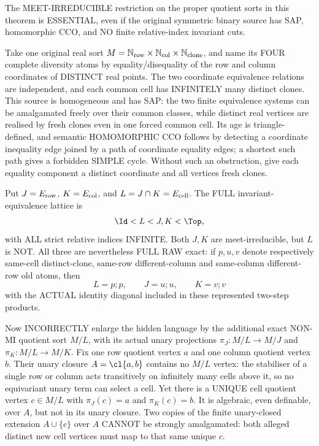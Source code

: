 \begin{example}
\label{ex:typed-exact-nonmi-hidden-sap-failure}
The MEET-IRREDUCIBLE restriction on the
proper quotient sorts in this theorem is
ESSENTIAL, even if the original symmetric
binary source has SAP, homomorphic CCO,
and NO finite relative-index invariant cuts.

Take one original real sort
$M=\mathbb N_{\rm row}\times
\mathbb N_{\rm col}\times\mathbb N_{\rm clone}$,
and name its FOUR complete diversity atoms
by equality/disequality of the row and
column coordinates of DISTINCT real points.
The two coordinate equivalence relations
are independent, and each common cell
has INFINITELY many distinct clones.
This source is homogeneous and has SAP:
the two finite equivalence systems can
be amalgamated freely over their common
classes, while distinct real vertices
are realised by fresh clones even in
one forced common cell.  Its age is
triangle-defined, and semantic HOMOMORPHIC
CCO follows by detecting a coordinate
inequality edge joined by a path of
coordinate equality edges; a shortest
such path gives a forbidden SIMPLE cycle.
Without such an obstruction, give
each equality component a distinct
coordinate and all vertices fresh clones.

Put $J=E_{\rm row}$,
$K=E_{\rm col}$, and
$L=J\cap K=E_{\rm cell}$.
The FULL invariant-equivalence lattice is
\[
       \Id <L<J,K<\Top ,
\]
with ALL strict relative indices INFINITE.
Both $J,K$ are meet-irreducible, but $L$
is NOT.  All three are nevertheless
FULL RAW exact: if $p,u,v$ denote
respectively same-cell distinct-clone,
same-row different-column and same-column
different-row old atoms, then
\[
          L=p;p,\qquad J=u;u,\qquad K=v;v
\]
with the ACTUAL identity diagonal included
in these represented two-step products.

Now INCORRECTLY enlarge the hidden language
by the additional exact NON-MI quotient
sort $M/L$, with its actual unary projections
$\pi_J:M/L\to M/J$ and
$\pi_K:M/L\to M/K$.
Fix one row quotient vertex $a$ and one
column quotient vertex $b$. Their
unary closure $A=\cl\{a,b\}$ contains
no $M/L$ vertex: the stabiliser of
a single row or column acts transitively
on infinitely many cells above it,
so no equivariant unary term can
select a cell. Yet there is a UNIQUE
cell quotient vertex $c\in M/L$
with $\pi_J(c)=a$ and $\pi_K(c)=b$.
It is algebraic, even definable,
over $A$, but not in its unary closure.
Two copies of the finite unary-closed
extension $A\cup\{c\}$ over $A$ CANNOT
be strongly amalgamated: both alleged
distinct new cell vertices must map to
that same unique $c$.


\end{example}
